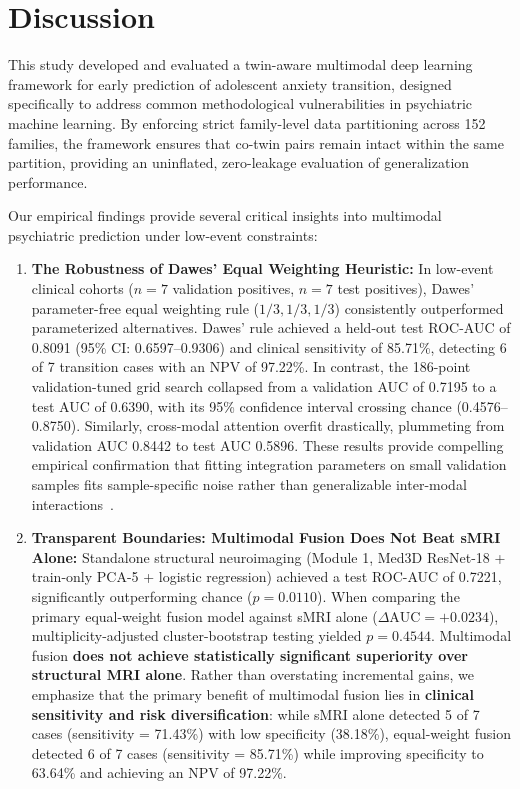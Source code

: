 \documentclass[10pt,letterpaper]{article}
\begin{document}
\section*{Discussion}

This study developed and evaluated a twin-aware multimodal deep learning framework for early prediction of adolescent anxiety transition, designed specifically to address common methodological vulnerabilities in psychiatric machine learning. By enforcing strict family-level data partitioning across 152 families, the framework ensures that co-twin pairs remain intact within the same partition, providing an uninflated, zero-leakage evaluation of generalization performance.

Our empirical findings provide several critical insights into multimodal psychiatric prediction under low-event constraints:
\begin{enumerate}
    \item \textbf{The Robustness of Dawes' Equal Weighting Heuristic:} In low-event clinical cohorts ($n=7$ validation positives, $n=7$ test positives), Dawes' parameter-free equal weighting rule ($1/3, 1/3, 1/3$) consistently outperformed parameterized alternatives. Dawes' rule achieved a held-out test ROC-AUC of 0.8091 (95\% CI: 0.6597--0.9306) and clinical sensitivity of 85.71\%, detecting 6 of 7 transition cases with an NPV of 97.22\%. In contrast, the 186-point validation-tuned grid search collapsed from a validation AUC of 0.7195 to a test AUC of 0.6390, with its 95\% confidence interval crossing chance (0.4576--0.8750). Similarly, cross-modal attention overfit drastically, plummeting from validation AUC 0.8442 to test AUC 0.5896. These results provide compelling empirical confirmation that fitting integration parameters on small validation samples fits sample-specific noise rather than generalizable inter-modal interactions~\cite{ref_dawes}.
    \item \textbf{Transparent Boundaries: Multimodal Fusion Does Not Beat sMRI Alone:} Standalone structural neuroimaging (Module 1, Med3D ResNet-18 + train-only PCA-5 + logistic regression) achieved a test ROC-AUC of 0.7221, significantly outperforming chance ($p = 0.0110$). When comparing the primary equal-weight fusion model against sMRI alone ($\Delta\text{AUC} = +0.0234$), multiplicity-adjusted cluster-bootstrap testing yielded $p = 0.4544$. Multimodal fusion \textbf{does not achieve statistically significant superiority over structural MRI alone}. Rather than overstating incremental gains, we emphasize that the primary benefit of multimodal fusion lies in \textbf{clinical sensitivity and risk diversification}: while sMRI alone detected 5 of 7 cases (sensitivity = 71.43\%) with low specificity (38.18\%), equal-weight fusion detected 6 of 7 cases (sensitivity = 85.71\%) while improving specificity to 63.64\% and achieving an NPV of 97.22\%.

\end{enumerate}
\end{document}
